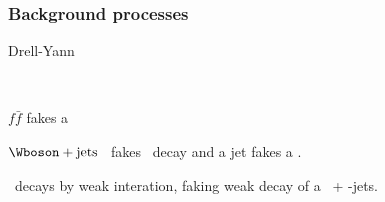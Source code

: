 \begin{frame}
\frametitle{Background processes}
\begin{block}{Drell-Yann}
\hfill
\begin{minipage}[c]{.45\textwidth}
\vspace{\baselineskip}



~
\end{minipage}
\hfill
\begin{minipage}[c]{.4\linewidth}
$f\bar{f}$ fakes a \leptau\antitau
\end{minipage}
\end{block}

\begin{block}{$\Wboson+\text{jets}$}
\Wboson\ fakes \tau\ decay and a jet fakes a \tauh.
\end{block}

\begin{block}{\quarkt\antiquarkt}
\quarkt\ decays by weak interation, faking weak decay of a \tau\ + \quarkb-jets.
\end{block}

\end{frame}
